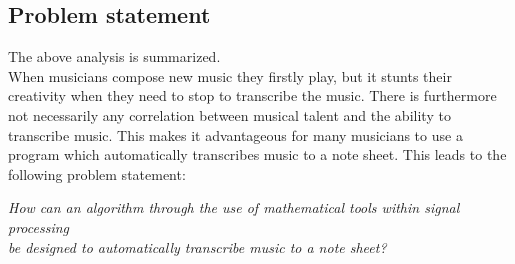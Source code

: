 \subsection{Problem statement}
The above analysis is summarized.\\
When musicians compose new music they firstly play, but it stunts their creativity when they need to stop to transcribe the music. There is furthermore not necessarily any correlation between musical talent and the ability to transcribe music. This makes it advantageous for many musicians to use a program which automatically transcribes music to a note sheet. This leads to the following problem statement:

\begin{center}
\textit{How can an algorithm through the use of mathematical tools within signal processing  \\
be designed to automatically transcribe music to a note sheet?}
\end{center}
%
